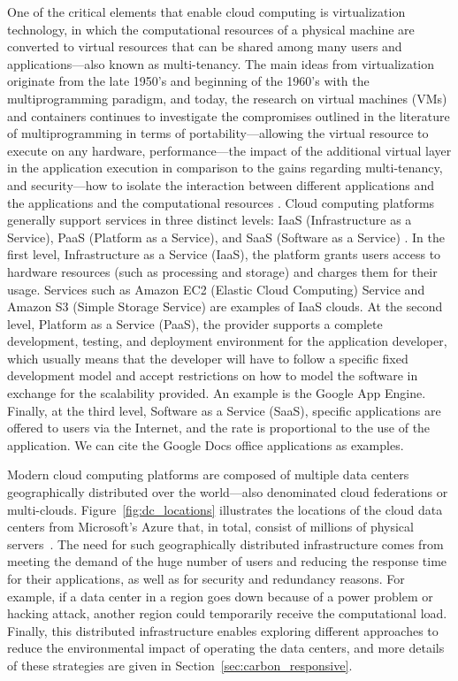 One of the critical elements that enable cloud computing is virtualization technology, in which the computational resources of a physical machine are converted to virtual resources that can be shared among many users and applications---also known as multi-tenancy.  The main ideas from virtualization originate from the late 1950's and beginning of the 1960's with the multiprogramming paradigm, and today, the research on virtual machines (VMs) and containers continues to investigate the compromises outlined in the literature of multiprogramming in terms of portability---allowing the virtual resource to execute on any hardware,  performance---the impact of the additional virtual layer in the application execution in comparison to the gains regarding multi-tenancy, and security---how to isolate the interaction between different applications and the applications and the computational resources \cite{randall2020_virtualization}.
Cloud computing platforms generally support services in three distinct levels: IaaS (Infrastructure as a Service), PaaS (Platform as a Service), and SaaS (Software as a Service) \citep{fos08}. In the first level, Infrastructure as a Service (IaaS), the platform grants users access to hardware resources (such as processing and storage) and charges them for their usage. Services such as Amazon EC2 (Elastic Cloud Computing) Service and Amazon S3 (Simple Storage Service) are examples of IaaS clouds.   At the second level, Platform as a Service (PaaS), the provider supports a complete development, testing, and deployment environment for the application developer, which usually means that the developer will have to follow a specific fixed development model and accept restrictions on how to model the software in exchange for the scalability provided. An example is the Google App Engine. Finally, at the third level, Software as a Service (SaaS), specific applications are offered to users via the Internet, and the rate is proportional to the use of the application. We can cite the  Google Docs office applications as examples.


Modern cloud computing platforms are composed of multiple data centers geographically distributed over the world---also denominated cloud federations or multi-clouds. Figure~\ref{fig:dc_locations} illustrates the locations of the cloud data centers from Microsoft's Azure that, in total, consist of millions of physical servers~\cite{roach2021_microsoftazure}. The need for such geographically distributed infrastructure comes from meeting the demand of the huge number of users and reducing the response time for their applications, as well as for security and redundancy reasons. For example, if a data center in a region goes down because of a power problem or hacking attack, another region could temporarily receive the computational load. Finally, this distributed infrastructure enables exploring different approaches to reduce the environmental impact of operating the data centers, and more details of these strategies are given in Section~\ref{sec:carbon_responsive}.


